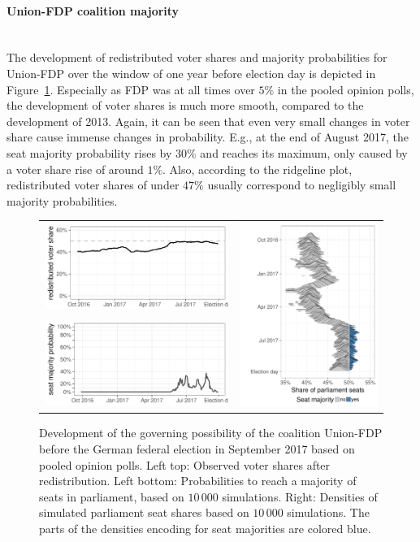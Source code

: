 \documentclass[smallcondensed]{svjour3}     %
\begin{document}
\paragraph{Union-FDP coalition majority} \ \\
The development of redistributed voter shares and majority probabilities
for Union-FDP over the window of one year before election day
is depicted in Figure~\ref{fig:2017_cdufdp}.
Especially as FDP was at all times over $5\%$ in the pooled opinion polls,
the development of voter shares is much more smooth, compared to 
the development of 2013.
Again, it can be seen that even very small changes in voter share
cause immense changes in probability. E.g., at the end of August 2017,
the seat majority probability rises by $30\%$ and reaches its
maximum, only caused by a voter share rise of around $1\%$.
Also, according to the ridgeline plot, redistributed voter shares of under
$47\%$ usually correspond to negligibly small majority probabilities.

\begin{figure}[H]\centering
\begin{tabular}{ll}
\includegraphics[height=.15\textwidth]{figures/2017_pooled_cdufdp_rawSharesRedist.pdf}
&
\multirow{2}{*}[13ex]{\includegraphics[height=30ex]{figures/2017_pooled_cdufdp_ridgeline.pdf}}
\\
\includegraphics[height=.15\textwidth]{figures/2017_pooled_cdufdp_prob.pdf}
\end{tabular}
\caption{Development of the governing possibility of the coalition Union-FDP before the German federal election in September 2017 based on pooled opinion polls.
Left top: Observed voter shares after redistribution. Left bottom: Probabilities to reach a majority of seats in parliament, based on $10\,000$ simulations. Right: Densities of simulated parliament seat shares based on $10\,000$ simulations. The parts of the densities encoding for seat majorities are colored blue.
\label{fig:2017_cdufdp}
}
\end{figure}
\end{document}
